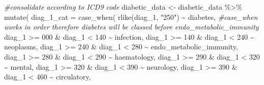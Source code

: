 \documentclass[
]{article}
\newenvironment{Shaded}{\begin{snugshade}}{\end{snugshade}}
\newcommand{\AttributeTok}[1]{\textcolor[rgb]{0.77,0.63,0.00}{#1}}
\newcommand{\CommentTok}[1]{\textcolor[rgb]{0.56,0.35,0.01}{\textit{#1}}}
\newcommand{\DecValTok}[1]{\textcolor[rgb]{0.00,0.00,0.81}{#1}}
\newcommand{\FunctionTok}[1]{\textcolor[rgb]{0.00,0.00,0.00}{#1}}
\newcommand{\NormalTok}[1]{#1}
\newcommand{\OtherTok}[1]{\textcolor[rgb]{0.56,0.35,0.01}{#1}}
\newcommand{\SpecialCharTok}[1]{\textcolor[rgb]{0.00,0.00,0.00}{#1}}
\newcommand{\StringTok}[1]{\textcolor[rgb]{0.31,0.60,0.02}{#1}}
\begin{document}
\begin{Shaded}
\begin{Highlighting}[]
\CommentTok{\#consolidate according to ICD9 code}
\NormalTok{diabetic\_data }\OtherTok{\textless{}{-}}\NormalTok{ diabetic\_data }\SpecialCharTok{\%\textgreater{}\%}
  \FunctionTok{mutate}\NormalTok{(}
    \AttributeTok{diag\_1\_cat =} \FunctionTok{case\_when}\NormalTok{(}
      \FunctionTok{rlike}\NormalTok{(diag\_1, }\StringTok{"250"}\NormalTok{) }\SpecialCharTok{\textasciitilde{}} \StringTok{\textquotesingle{}diabetes\textquotesingle{}}\NormalTok{, }\CommentTok{\#case\_when works in order therefore \textquotesingle{}diabetes\textquotesingle{} will be classed before \textquotesingle{}endo\_metabolic\_immunity\textquotesingle{}}
\NormalTok{      diag\_1 }\SpecialCharTok{\textgreater{}=} \DecValTok{000} \SpecialCharTok{\&}\NormalTok{ diag\_1 }\SpecialCharTok{\textless{}} \DecValTok{140} \SpecialCharTok{\textasciitilde{}} \StringTok{\textquotesingle{}infection\textquotesingle{}}\NormalTok{,}
\NormalTok{      diag\_1 }\SpecialCharTok{\textgreater{}=} \DecValTok{140} \SpecialCharTok{\&}\NormalTok{ diag\_1 }\SpecialCharTok{\textless{}} \DecValTok{240} \SpecialCharTok{\textasciitilde{}} \StringTok{\textquotesingle{}neoplasms\textquotesingle{}}\NormalTok{,}
\NormalTok{      diag\_1 }\SpecialCharTok{\textgreater{}=} \DecValTok{240} \SpecialCharTok{\&}\NormalTok{ diag\_1 }\SpecialCharTok{\textless{}} \DecValTok{280} \SpecialCharTok{\textasciitilde{}} \StringTok{\textquotesingle{}endo\_metabolic\_immunity\textquotesingle{}}\NormalTok{,}
\NormalTok{      diag\_1 }\SpecialCharTok{\textgreater{}=} \DecValTok{280} \SpecialCharTok{\&}\NormalTok{ diag\_1 }\SpecialCharTok{\textless{}} \DecValTok{290} \SpecialCharTok{\textasciitilde{}} \StringTok{\textquotesingle{}haematology\textquotesingle{}}\NormalTok{,}
\NormalTok{      diag\_1 }\SpecialCharTok{\textgreater{}=} \DecValTok{290} \SpecialCharTok{\&}\NormalTok{ diag\_1 }\SpecialCharTok{\textless{}} \DecValTok{320} \SpecialCharTok{\textasciitilde{}} \StringTok{\textquotesingle{}mental\textquotesingle{}}\NormalTok{,}
\NormalTok{      diag\_1 }\SpecialCharTok{\textgreater{}=} \DecValTok{320} \SpecialCharTok{\&}\NormalTok{ diag\_1 }\SpecialCharTok{\textless{}} \DecValTok{390} \SpecialCharTok{\textasciitilde{}} \StringTok{\textquotesingle{}neurology\textquotesingle{}}\NormalTok{,}
\NormalTok{      diag\_1 }\SpecialCharTok{\textgreater{}=} \DecValTok{390} \SpecialCharTok{\&}\NormalTok{ diag\_1 }\SpecialCharTok{\textless{}} \DecValTok{460} \SpecialCharTok{\textasciitilde{}} \StringTok{\textquotesingle{}circulatory\textquotesingle{}}\NormalTok{,}

\end{Highlighting}
\end{Shaded}
\end{document}
